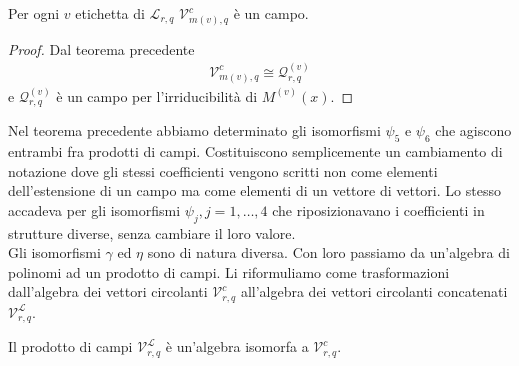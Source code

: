 \begin{corollario}
   Per ogni $v$ etichetta di $\mathscr{L}_{r,q} $  $\mathcal{V}_{m(v),q}^{c}$ è un campo. 
\end{corollario}
\begin{proof}
   Dal teorema precedente
     \begin{align*}
     \mathcal{V}_{m(v),q}^{c} 
     \cong  
     \mathcal{Q}_{r,q}^{(v)}
  \end{align*}
  e $\mathcal{Q}_{r,q}^{(v)}$ è un campo per l'irriducibilità di $M^{(v)}(x)$.
\end{proof}

Nel teorema precedente abbiamo determinato gli isomorfismi $\psi_{5}$ e $\psi_{6}$ che agiscono entrambi fra prodotti di campi.
Costituiscono semplicemente un cambiamento di notazione dove gli stessi coefficienti vengono scritti non come elementi dell'estensione di un campo ma come elementi di un vettore di vettori. Lo stesso accadeva per gli isomorfismi $\psi_{j}, j=1,\dots , 4$ che riposizionavano i coefficienti in strutture diverse, senza cambiare il loro valore.\\
Gli isomorfismi $\gamma$ ed $\eta$ sono di natura diversa. Con loro passiamo da un'algebra di polinomi ad un prodotto di campi. Li riformuliamo come trasformazioni dall'algebra dei vettori circolanti $\mathcal{V}_{r,q}^{c} $ all'algebra dei vettori circolanti concatenati $\mathcal{V}_{r,q}^{\mathscr{L} } $.
\begin{corollario}
   Il prodotto di campi $\mathcal{V}_{r,q}^{\mathscr{L} } $ è un'algebra isomorfa a $\mathcal{V}_{r,q}^{c} $.
\end{corollario}

